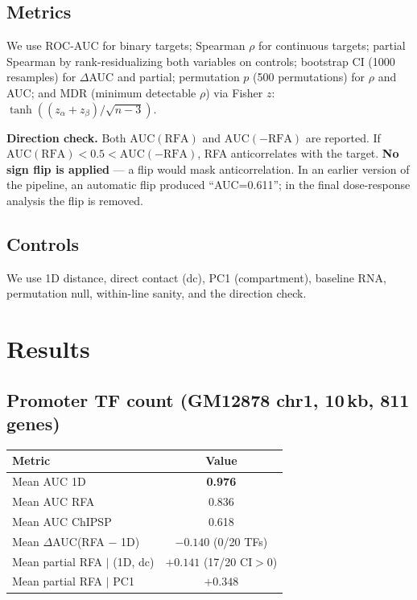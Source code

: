 \documentclass[11pt,a4paper]{article}
\begin{document}
\subsection{Metrics}
We use ROC-AUC for binary targets; Spearman $\rho$ for continuous targets; partial Spearman by rank-residualizing both variables on controls; bootstrap CI (1000 resamples) for $\Delta$AUC and partial; permutation $p$ (500 permutations) for $\rho$ and AUC; and MDR (minimum detectable $\rho$) via Fisher $z$: $\tanh((z_\alpha + z_\beta)/\sqrt{n-3})$.

\textbf{Direction check.} Both $\mathrm{AUC}(\mathrm{RFA})$ and $\mathrm{AUC}(-\mathrm{RFA})$ are reported. If $\mathrm{AUC}(\mathrm{RFA})<0.5<\mathrm{AUC}(-\mathrm{RFA})$, RFA anticorrelates with the target. \textbf{No sign flip is applied} --- a flip would mask anticorrelation. In an earlier version of the pipeline, an automatic flip produced ``AUC=0.611''; in the final dose-response analysis the flip is removed.

\subsection{Controls}
We use 1D distance, direct contact (dc), PC1 (compartment), baseline RNA, permutation null, within-line sanity, and the direction check.

\section{Results}

\subsection{Promoter TF count (GM12878 chr1, 10\,kb, 811 genes)}
\begin{table}[h]
\centering
\begin{tabular}{lc}
\toprule
Metric & Value \\
\midrule
Mean AUC 1D & \textbf{0.976} \\
Mean AUC RFA & 0.836 \\
Mean AUC ChIPSP & 0.618 \\
Mean $\Delta$AUC(RFA $-$ 1D) & \textbf{$-0.140$} (0/20 TFs) \\
Mean partial RFA $\mid$ (1D, dc) & $+0.141$ (17/20 CI$>0$) \\
Mean partial RFA $\mid$ PC1 & $+0.348$ \\
\bottomrule
\end{tabular}
\end{table}
\end{document}
